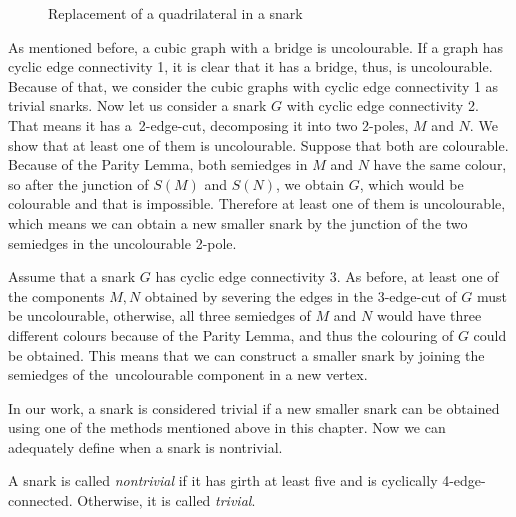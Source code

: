 \begin{figure}
	\centering
	
	\caption{Replacement of a quadrilateral in a snark}
	\label{fig:trivial-quadrilateral}
\end{figure}

As mentioned before, a cubic graph with a bridge is uncolourable. If a graph has cyclic edge connectivity 1, it is clear that it has a bridge, thus, is uncolourable. Because of that, we consider the cubic graphs with cyclic edge connectivity 1 as trivial snarks. Now let us consider a snark $G$ with cyclic edge connectivity 2. That means it has a~2-edge-cut, decomposing it into two 2-poles, $M$ and $N$. We show that at least one of them is uncolourable. Suppose that both are colourable. Because of the Parity Lemma, both semiedges in $M$ and $N$ have the same colour, so after the junction of $S(M)$ and $S(N)$, we obtain $G$, which would be colourable and that is impossible. Therefore at least one of them is uncolourable, which means we can obtain a new smaller snark by the junction of the two semiedges in the uncolourable 2-pole.

Assume that a snark $G$ has cyclic edge connectivity $3$. As before, at least one of the components $M, N$ obtained by severing the edges in the 3-edge-cut of $G$ must be uncolourable, otherwise, all three semiedges of $M$ and $N$ would have three different colours because of the Parity Lemma, and thus the colouring of $G$ could be obtained. This means that we can construct a smaller snark by joining the semiedges of the~uncolourable component in a new vertex.

In our work, a snark is considered trivial if a new smaller snark can be obtained using one of the methods mentioned above in this chapter. Now we can adequately define when a snark is nontrivial.

\begin{definition}
	A snark is called \textit{nontrivial} if it has girth at least five and is cyclically 4-edge-connected. Otherwise, it is called \textit{trivial}.
\end{definition}